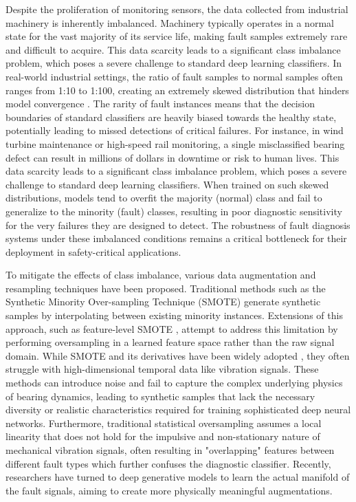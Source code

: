 Despite the proliferation of monitoring sensors, the data collected from industrial machinery is inherently imbalanced. Machinery typically operates in a normal state for the vast majority of its service life, making fault samples extremely rare and difficult to acquire. This data scarcity leads to a significant class imbalance problem, which poses a severe challenge to standard deep learning classifiers. In real-world industrial settings, the ratio of fault samples to normal samples often ranges from 1:10 to 1:100, creating an extremely skewed distribution that hinders model convergence \cite{32, 40}. The rarity of fault instances means that the decision boundaries of standard classifiers are heavily biased towards the healthy state, potentially leading to missed detections of critical failures. For instance, in wind turbine maintenance or high-speed rail monitoring, a single misclassified bearing defect can result in millions of dollars in downtime or risk to human lives. This data scarcity leads to a significant class imbalance problem, which poses a severe challenge to standard deep learning classifiers. When trained on such skewed distributions, models tend to overfit the majority (normal) class and fail to generalize to the minority (fault) classes, resulting in poor diagnostic sensitivity for the very failures they are designed to detect. The robustness of fault diagnosis systems under these imbalanced conditions remains a critical bottleneck for their deployment in safety-critical applications.

To mitigate the effects of class imbalance, various data augmentation and resampling techniques have been proposed. Traditional methods such as the Synthetic Minority Over-sampling Technique (SMOTE) \cite{6} generate synthetic samples by interpolating between existing minority instances. Extensions of this approach, such as feature-level SMOTE \cite{18}, attempt to address this limitation by performing oversampling in a learned feature space rather than the raw signal domain. While SMOTE and its derivatives have been widely adopted \cite{1, 2, 5, 35}, they often struggle with high-dimensional temporal data like vibration signals. These methods can introduce noise and fail to capture the complex underlying physics of bearing dynamics, leading to synthetic samples that lack the necessary diversity or realistic characteristics required for training sophisticated deep neural networks. Furthermore, traditional statistical oversampling assumes a local linearity that does not hold for the impulsive and non-stationary nature of mechanical vibration signals, often resulting in "overlapping" features between different fault types which further confuses the diagnostic classifier. Recently, researchers have turned to deep generative models to learn the actual manifold of the fault signals, aiming to create more physically meaningful augmentations.

